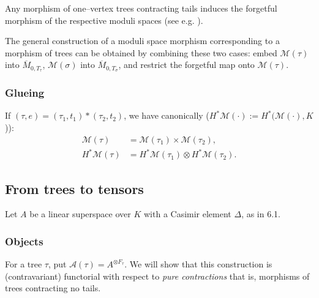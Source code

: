 \documentclass[reqno]{amsart}
\theoremstyle{definition}
\begin{document}
\smallskip

Any morphism of one--vertex trees contracting tails induces
the forgetful morphism of the respective moduli spaces
(see e.g. \cite{Ke}).

\smallskip

The general construction of a moduli space morphism corresponding
to a morphism of trees can be obtained by combining these
two cases:
embed $\mathcal{M}(\tau )$ into $\overline{M}_{0,T_{\tau}}$,
$\mathcal{M}(\sigma )$ into $\overline{M}_{0,T_{\sigma}}$,
and restrict the forgetful map onto $\mathcal{M}(\tau )$.

\medskip

\subsubsection{Glueing}
If $(\tau ,e)=(\tau_1,t_1)*(\tau_2,t_2)$,
we have canonically
($H^*\mathcal{M}(\cdot ):=H^*(\mathcal{M}(\cdot ),K$)):
\begin{align*}
  \mathcal{M}(\tau )    &
  =\mathcal{M}(\tau_1)\times\mathcal{M}(\tau_2),         \\
  H^*\mathcal{M}(\tau ) & =H^*\mathcal{M}(\tau_1)\otimes
  H^*\mathcal{M}(\tau_2).
  \tag{6.5}
\end{align*}

\medskip

\subsection{From trees to tensors}
Let $A$ be a linear superspace
over $K$ with a Casimir element $\Delta $, as in 6.1.

\smallskip

\subsubsection{Objects}
For a tree $\tau$, put
$\mathcal{A}(\tau )=A^{\otimes F_{\tau}}$.
We will show that this construction is (contravariant) functorial
with respect to {\it pure contractions} that is,
morphisms of trees contracting no tails.

\smallskip

\end{document}
